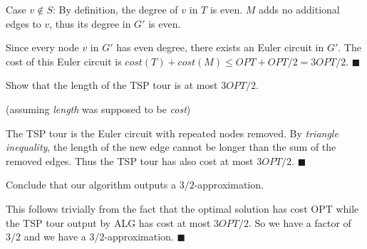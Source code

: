 \documentclass[../main.tex]{subfiles}
\begin{document}
\begin{questions}
\begin{solution}
    Case $v \notin S$: By definition, the degree of $v$ in $T$ is even. $M$ adds no additional edges to $v$, thus its degree in $G'$ is even.

    Since every node $v$ in $G'$ has even degree, there exists an Euler circuit in $G'$. The cost of this Euler circuit is $cost(T) + cost(M) \le OPT + OPT/2 = 3OPT/2$. $\blacksquare$
  \end{solution}

  \question Show that the length of the TSP tour is at most $3OPT/2$.
  \begin{solution}
    (assuming \textit{length} was supposed to be \textit{cost})

    The TSP tour is the Euler circuit with repeated nodes removed. By \textit{triangle inequality}, the length of the new edge cannot be longer than the sum of the removed edges. Thus the TSP tour has also cost at most $3OPT/2$. $\blacksquare$
  \end{solution}

  \question Conclude that our algorithm outputs a $3/2$-approximation.
  \begin{solution}
    This follows trivially from the fact that the optimal solution has cost OPT while the TSP tour output by ALG has cost at most $3OPT/2$. So we have a factor of $3/2$ and we have a $3/2$-approximation. $\blacksquare$
  \end{solution}

\end{questions}
\end{document}
